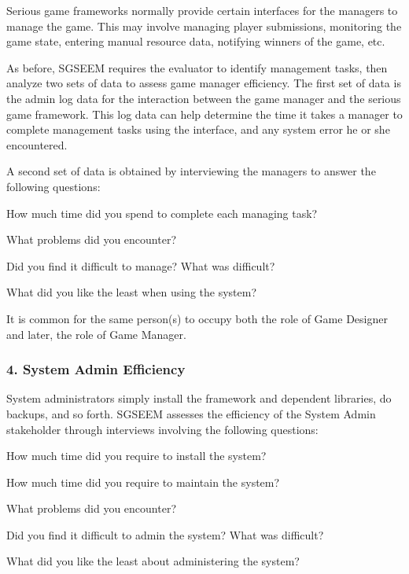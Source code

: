 \documentclass{sigchi}
\begin{document}
Serious game frameworks normally provide certain interfaces for the managers to manage the
game. This may involve managing player submissions, monitoring the game state, entering
manual resource data, notifying winners of the game, etc.

As before, SGSEEM requires the evaluator to identify management tasks, then
analyze two sets of data to assess game manager efficiency. The
first set of data is the admin log data for the interaction between
the game manager and the serious game framework. This log data can help 
determine the time it takes a manager to complete
management tasks using the interface, and any system error he or she
encountered. 

A second set of data is obtained by interviewing
the managers to answer the following questions:

\begin{compactitem}
\item How much time did you spend to complete each managing task?
\item What problems did you encounter?
\item Did you find it difficult to manage? What was difficult?
\item What did you like the least when using the system?
\end{compactitem}



It is common for the same person(s) to occupy both the role of Game Designer and
later, the role of Game Manager. 

\subsubsection{4. System Admin Efficiency}


System administrators simply install the framework and dependent libraries, do backups,
and so forth.  SGSEEM assesses the efficiency of the System Admin stakeholder through
interviews involving the following questions:

\begin{compactitem}
\item How much time did you require to install the system?
\item How much time did you require to maintain the system?
\item What problems did you encounter?
\item Did you find it difficult to admin the system? What was difficult?
\item What did you like the least about administering the system?
\end{compactitem}
\end{document}
